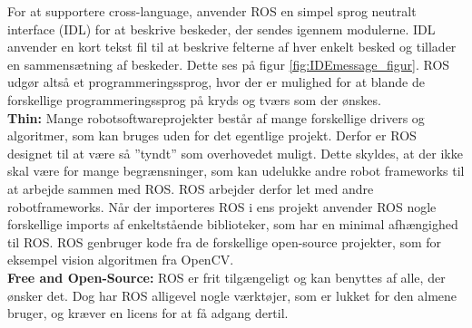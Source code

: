 For at supportere cross-language, anvender ROS en simpel sprog neutralt interface (IDL) for at beskrive beskeder, der sendes igennem modulerne.
IDL anvender en kort tekst fil til at beskrive felterne af hver enkelt besked og tillader en sammensætning af beskeder.
Dette ses på figur \ref{fig:IDEmessage_figur}.
ROS udgør altså et programmeringssprog, hvor der er mulighed for at blande de forskellige programmeringssprog på kryds og tværs som der ønskes.\\
\newline
\textbf{Thin:} Mange robotsoftwareprojekter består af mange forskellige drivers og algoritmer, som kan bruges uden for det egentlige projekt.
Derfor er ROS designet til at være så ”tyndt” som overhovedet muligt.
Dette skyldes, at der ikke skal være for mange begrænsninger, som kan udelukke andre robot frameworks til at arbejde sammen med ROS.
ROS arbejder derfor let med andre robotframeworks.
Når der importeres ROS i ens projekt anvender ROS nogle forskellige imports af enkeltstående biblioteker, som har en minimal afhængighed til ROS.
ROS genbruger kode fra de forskellige open-source projekter, som for eksempel vision algoritmen fra OpenCV.\\
\newline
\textbf{Free and Open-Source:}
ROS er frit tilgængeligt og kan benyttes af alle, der ønsker det.
Dog har ROS alligevel nogle værktøjer, som er lukket for den almene bruger, og kræver en licens for at få adgang dertil.

